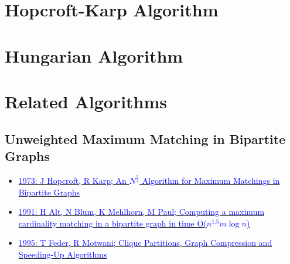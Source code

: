 \documentclass[oneside]{book}
\begin{document}
\chapter{Hopcroft-Karp Algorithm}
\newpage


\chapter{Hungarian Algorithm}
\newpage


\chapter{Related Algorithms}
\section{Unweighted Maximum Matching in Bipartite Graphs}
\begin{itemize}
    \item \href{https://epubs.siam.org/doi/10.1137/0202019}{\textcolor{blue}{1973: J Hopcroft, R Karp; An $N^{\frac{5}{2}}$ Algorithm for Maximum Matchings in Bipartite Graphs}}
    \item \href{https://www.sciencedirect.com/science/article/abs/pii/002001909190195N}{\textcolor{blue}{1991: H Alt, N Blum, K Mehlhorn, M Paul; Computing a maximum cardinality matching in a bipartite graph in time O($n^{1.5}m\log n$)}}
    \item \href{https://www.sciencedirect.com/science/article/pii/S0022000085710653}{\textcolor{blue}{1995: T Feder, R Motwani; Clique Partitions, Graph Compression and Speeding-Up Algorithms}}
\end{itemize}
\end{document}
